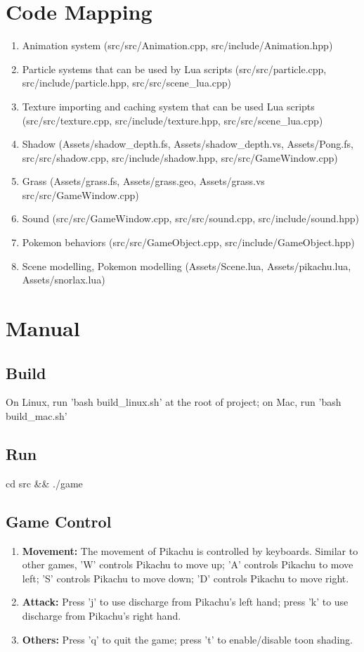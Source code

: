 \documentclass {article}
\begin{document}
\section{Code Mapping}
\begin{enumerate}
    \item Animation system (src/src/Animation.cpp, src/include/Animation.hpp)
    \item Particle systems that can be used by Lua scripts  (src/src/particle.cpp, src/include/particle.hpp, src/src/scene\_lua.cpp)
    \item Texture importing and caching system that can be used Lua scripts (src/src/texture.cpp, src/include/texture.hpp, src/src/scene\_lua.cpp)
    \item Shadow (Assets/shadow\_depth.fs, Assets/shadow\_depth.vs, Assets/Pong.fs, src/src/shadow.cpp, src/include/shadow.hpp, src/src/GameWindow.cpp)
    \item Grass (Assets/grass.fs, Assets/grass.geo, Assets/grass.vs src/src/GameWindow.cpp)
    \item Sound (src/src/GameWindow.cpp, src/src/sound.cpp, src/include/sound.hpp)
    \item Pokemon behaviors (src/src/GameObject.cpp, src/include/GameObject.hpp)
    \item Scene modelling, Pokemon modelling (Assets/Scene.lua, Assets/pikachu.lua, Assets/snorlax.lua)
\end{enumerate}

\section{Manual}
    \subsection{Build}
    On Linux, run 'bash build\_linux.sh' at the root of project; on Mac, run 'bash build\_mac.sh'
    \subsection{Run}
    cd src \&\& ./game
    \subsection{Game Control}
    \begin{enumerate}
        \item  \textbf{Movement:} The movement of Pikachu is controlled by keyboards. Similar to other games, 'W' controls Pikachu to move up; 'A' controls Pikachu to move left;
        'S' controls Pikachu to move down; 'D' controls Pikachu to move right.
        \item \textbf{Attack:} Press 'j' to use discharge from Pikachu's left hand; press 'k' to use discharge from Pikachu's right hand.
        \item \textbf{Others:} Press 'q' to quit the game; press 't' to enable/disable toon shading.
    \end{enumerate}
\end{document}
